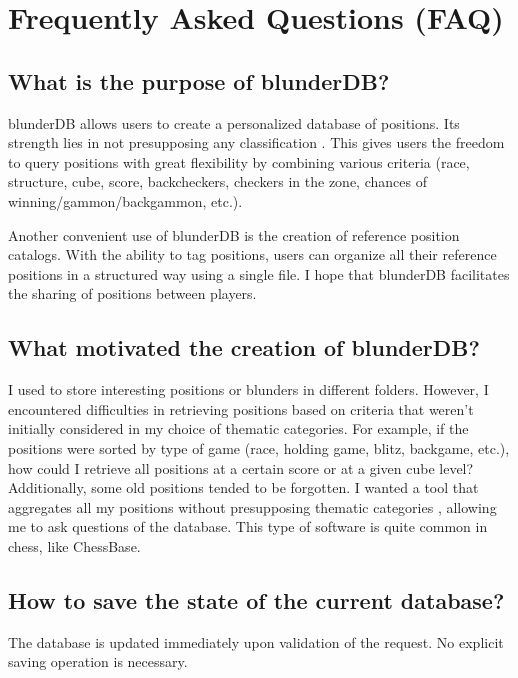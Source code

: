 \documentclass[letterpaper,10pt,english]{sphinxmanual}
\begin{document}
\sphinxstepscope


\section{Frequently Asked Questions (FAQ)}
\label{\detokenize{faq:foire-aux-questions}}\label{\detokenize{faq:faq}}\label{\detokenize{faq::doc}}

\subsection{What is the purpose of blunderDB?}
\label{\detokenize{faq:quel-est-l-utilite-de-blunderdb}}
\sphinxAtStartPar
blunderDB allows users to create a personalized database of positions. Its strength lies in not presupposing any classification . This gives users the freedom to query positions with great flexibility by combining various criteria (race, structure, cube, score, backcheckers, checkers in the zone, chances of winning/gammon/backgammon, etc.).

\sphinxAtStartPar
Another convenient use of blunderDB is the creation of reference position catalogs. With the ability to tag positions, users can organize all their reference positions in a structured way using a single file. I hope that blunderDB facilitates the sharing of positions between players.


\subsection{What motivated the creation of blunderDB?}
\label{\detokenize{faq:qu-est-ce-qui-a-motive-la-creation-de-blunderdb}}
\sphinxAtStartPar
I used to store interesting positions or blunders in different folders. However, I encountered difficulties in retrieving positions based on criteria that weren’t initially considered in my choice of thematic categories. For example, if the positions were sorted by type of game (race, holding game, blitz, backgame, etc.), how could I retrieve all positions at a certain score or at a given cube level? Additionally, some old positions tended to be forgotten. I wanted a tool that aggregates all my positions without presupposing thematic categories , allowing me to ask questions of the database. This type of software is quite common in chess, like ChessBase.


\subsection{How to save the state of the current database?}
\label{\detokenize{faq:comment-sauvegarder-la-base-de-donnees-courante}}
\sphinxAtStartPar
The database is updated immediately upon validation of the request. No explicit saving operation is necessary.
\end{document}
